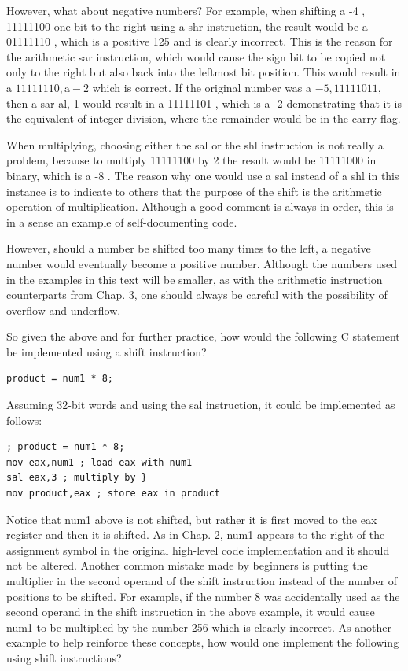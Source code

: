 \documentclass[10pt]{article}
\begin{document}
However, what about negative numbers? For example, when shifting a -4 , 11111100 one bit to the right using a shr instruction, the result would be a 01111110 , which is a positive 125 and is clearly incorrect. This is the reason for the arithmetic sar instruction, which would cause the sign bit to be copied not only to the right but also back into the leftmost bit position. This would result in a $11111110, \mathrm{a}-2$ which is correct. If the original number was a $-5,11111011$, then a sar al, 1 would result in a 11111101 , which is a -2 demonstrating that it is the equivalent of integer division, where the remainder would be in the carry flag.

When multiplying, choosing either the sal or the shl instruction is not really a problem, because to multiply 11111100 by 2 the result would be 11111000 in binary, which is a -8 . The reason why one would use a sal instead of a shl in this instance is to indicate to others that the purpose of the shift is the arithmetic operation of multiplication. Although a good comment is always in order, this is in a sense an example of self-documenting code.

However, should a number be shifted too many times to the left, a negative number would eventually become a positive number. Although the numbers used in the examples in this text will be smaller, as with the arithmetic instruction counterparts from Chap. 3, one should always be careful with the possibility of overflow and underflow.

So given the above and for further practice, how would the following C statement be implemented using a shift instruction?

\begin{verbatim}
product = num1 * 8;
\end{verbatim}

Assuming 32-bit words and using the sal instruction, it could be implemented as follows:

\begin{verbatim}
; product = num1 * 8;
mov eax,num1 ; load eax with num1
sal eax,3 ; multiply by }
mov product,eax ; store eax in product
\end{verbatim}

Notice that num1 above is not shifted, but rather it is first moved to the eax register and then it is shifted. As in Chap. 2, num1 appears to the right of the assignment symbol in the original high-level code implementation and it should not be altered. Another common mistake made by beginners is putting the multiplier in the second operand of the shift instruction instead of the number of positions to be shifted. For example, if the number 8 was accidentally used as the second operand in the shift instruction in the above example, it would cause num1 to be multiplied by the number 256 which is clearly incorrect. As another example to help reinforce these concepts, how would one implement the following using shift instructions?
\end{document}
